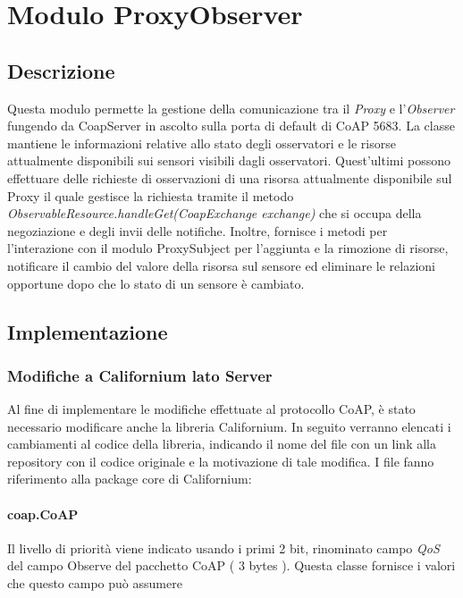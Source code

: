 \chapter{Modulo ProxyObserver}
	\section {Descrizione}
		Questa modulo permette la gestione della comunicazione tra il \textit{Proxy} e l'\textit{Observer} fungendo da CoapServer in ascolto sulla porta di default di CoAP 5683. La classe mantiene le informazioni relative allo stato degli osservatori e le risorse attualmente disponibili sui sensori visibili dagli osservatori. Quest'ultimi possono effettuare delle richieste di osservazioni di una risorsa attualmente disponibile sul Proxy il quale gestisce la richiesta tramite il metodo \textit{ObservableResource.handleGet(CoapExchange exchange)} che si occupa della negoziazione e degli invii delle notifiche. \newline
		Inoltre, fornisce i metodi per l'interazione con il modulo ProxySubject per l'aggiunta e la rimozione di risorse, notificare il cambio del valore della risorsa sul sensore ed eliminare le relazioni opportune dopo che lo stato di un sensore è cambiato.
	\section {Implementazione}
		\subsection {Modifiche a Californium lato Server}
			Al fine di implementare le modifiche effettuate al protocollo CoAP, è stato necessario modificare anche la libreria Californium. In seguito verranno elencati i cambiamenti al codice della libreria, indicando il nome del file con un link alla repository con il codice originale e la motivazione di tale modifica. I file fanno riferimento alla package core di Californium:
			\subsubsection{coap.CoAP}
				Il livello di priorità viene indicato usando i primi 2 bit, rinominato campo \textit{QoS} del campo Observe del pacchetto CoAP ( 3 bytes ).  Questa classe fornisce i valori che questo campo può assumere\newline
				

